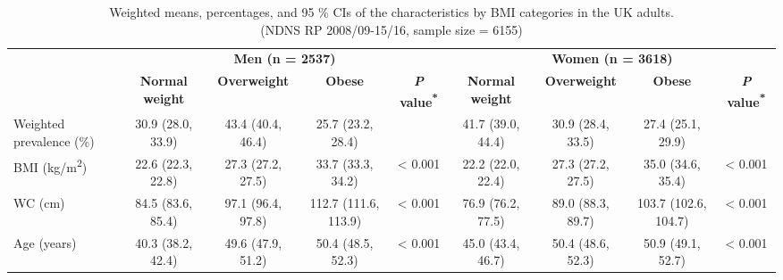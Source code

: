 \begin{table}
	
		
		\caption{\label{tab:tab1BMI}Weighted means, percentages, and 95 \% CIs of the characteristics by BMI categories in the UK adults. \\ (NDNS RP 2008/09-15/16, sample size = 6155)}
		\centering
		\fontsize{8.5}{11}\selectfont
		\begin{tabular}[t]{lcccccccc}
			\hiderowcolors
			\toprule
			\multicolumn{1}{c}{ } & \multicolumn{4}{c}{\textbf{Men (n = 2537)}} & \multicolumn{4}{c}{\textbf{Women (n = 3618)}} \\
			\cmidrule(l{2pt}r{2pt}){2-5} \cmidrule(l{2pt}r{2pt}){6-9}
			& \textbf{Normal weight} & \textbf{Overweight} & \textbf{Obese} & \textbf{\textit{P} value\textsuperscript{*}} & \textbf{Normal weight} & \textbf{Overweight} & \textbf{Obese} & \textbf{\textit{P} value\textsuperscript{*}}\\
			\midrule
			\showrowcolors
			Weighted prevalence (\%) & 30.9 (28.0, 33.9) & 43.4 (40.4, 46.4) & 25.7 (23.2, 28.4) &  & 41.7 (39.0, 44.4) & 30.9 (28.4, 33.5) & 27.4 (25.1, 29.9) & \\
			BMI (kg/m\textsuperscript{2}) & 22.6 (22.3, 22.8) & 27.3 (27.2, 27.5) & 33.7 (33.3, 34.2) & < 0.001 & 22.2 (22.0, 22.4) & 27.3 (27.2, 27.5) & 35.0 (34.6, 35.4) & < 0.001\\
			WC (cm) & 84.5 (83.6, 85.4) & 97.1 (96.4, 97.8) & 112.7 (111.6, 113.9) & < 0.001 & 76.9 (76.2, 77.5) & 89.0 (88.3, 89.7) & 103.7 (102.6, 104.7) & < 0.001\\
			Age (years) & 40.3 (38.2, 42.4) & 49.6 (47.9, 51.2) & 50.4 (48.5, 52.3) & < 0.001 & 45.0 (43.4, 46.7) & 50.4 (48.6, 52.3) & 50.9 (49.1, 52.7) & < 0.001\\

\end{tabular}
\end{table}
